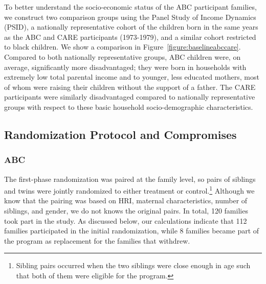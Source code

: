 \noindent To better understand the socio-economic status of the ABC participant families, we construct two comparison groups using the Panel Study of Income Dynamics (PSID), a nationally representative cohort of the children born in the same years as the ABC and CARE participants (1973-1979), and a similar cohort restricted to black children. We show a comparison in Figure~\ref{figure:baselineabccare}. Compared to both nationally representative groups, ABC children were, on average, significantly more disadvantaged; they were born in households with extremely low total parental income and to younger, less educated mothers, most of whom were raising their children without the support of a father. The CARE participants were similarly disadvantaged compared to nationally representative groups with respect to these basic household socio-demographic characteristics.\\

\subsection{Randomization Protocol and Compromises}

\subsubsection{ABC}

\noindent The first-phase randomization was paired at the family level, so pairs of siblings and twins were jointly randomized to either treatment or control.\footnote{Sibling pairs occurred when the two siblings were close enough in age such that both of them were eligible for the program.} Although we know that the pairing was based on HRI, maternal characteristics, number of siblings, and gender, we do not knows the original pairs. In total, 120 families took part in the study. As discussed below, our calculations indicate that 112 families participated in the initial randomization, while 8 families became part of the program as replacement for the families that withdrew.\\

